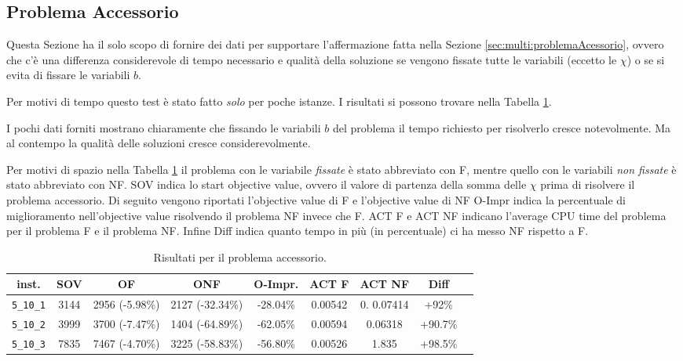 \subsection{Problema Accessorio}
\label{sec:benchmark:accessorio}
Questa Sezione ha il solo scopo di fornire dei dati per supportare l'affermazione
fatta nella Sezione \ref{sec:multi:problemaAcessorio}, ovvero che c'è una 
differenza  considerevole di tempo necessario e qualità della soluzione se 
vengono fissate 
tutte le variabili (eccetto le $\chi$) o se si evita di fissare le variabili
$b$.

Per motivi di tempo questo test è stato fatto \emph{solo} per poche istanze.
I risultati si possono trovare nella Tabella \ref{table:accessorio:res}.

I pochi dati forniti mostrano chiaramente che fissando le variabili $b$ del problema
il tempo richiesto per risolverlo cresce notevolmente. Ma al contempo la qualità
delle soluzioni cresce considerevolmente.

Per motivi di spazio nella Tabella \ref{table:accessorio:res} il problema con
le variabile \emph{fissate} è stato abbreviato con F, mentre quello con le
variabili \emph{non fissate} è stato abbreviato con NF.
SOV indica lo start objective
value, ovvero il valore di partenza della somma delle $\chi$ prima di risolvere
il problema accessorio.
Di seguito vengono riportati l'objective value di F e l'objective value di NF 
O-Impr indica la percentuale di miglioramento nell'objective value risolvendo
il problema NF invece che F. 
ACT F e ACT NF indicano l'average CPU time del problema per il problema F
e il problema NF. Infine Diff indica quanto tempo
in più (in percentuale) ci ha messo NF rispetto a F.


\begin{table}[h!]
\begin{center}
\small
\begin{tabular}{| c | c | c | c | c | c | c | c | c | }
\hline
inst.			& SOV	& OF				& ONF 				& O-Impr. 	& ACT F 	& ACT NF 		& Diff \\
\hline
\verb|5_10_1|	& 3144  	& 2956	(-5.98\%) 	& 2127 	(-32.34\%)	& -28.04\%	 			& 0.00542 	&  0. 0.07414 	& +92\% \\ 
\verb|5_10_2|	& 3999		& 3700	(-7.47\%)	& 1404	(-64.89\%)	& -62.05\%				& 0.00594	& 0.06318 		& +90.7\%\\
\verb|5_10_3|	& 7835		& 7467	(-4.70\%)	& 3225	(-58.83\%)	& -56.80\%				& 0.00526	& 1.835 		& +98.5\% \\

\hline
\end{tabular}
\caption{Risultati per il problema accessorio.}
\label{table:accessorio:res}
\end{center}
\end{table}
